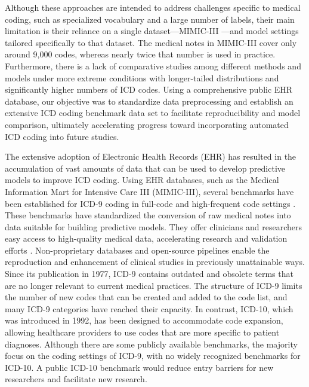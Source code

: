 \documentclass[11pt]{article}
\begin{document}
Although these approaches are intended to address challenges specific to medical coding, such as specialized vocabulary and a large number of labels, their main limitation is their reliance on a single dataset---MIMIC-III \citep{johnson2016mimic}---and model settings tailored specifically to that dataset. The medical notes in MIMIC-III cover only around 9,000 codes, whereas nearly twice that number is used in practice. Furthermore, there is a lack of comparative studies among different methods and models under more extreme conditions with longer-tailed distributions and significantly higher numbers of ICD codes. Using a comprehensive public EHR database, our objective was to standardize data preprocessing and establish an extensive ICD coding benchmark data set to facilitate reproducibility and model comparison, ultimately accelerating progress toward incorporating automated ICD coding into future studies.

The extensive adoption of Electronic Health Records (EHR) has resulted in the accumulation of vast amounts of data that can be used to develop predictive models to improve ICD coding. Using EHR databases, such as the Medical Information Mart for Intensive Care III (MIMIC-III), several benchmarks have been established for ICD-9 coding in full-code and high-frequent code settings \citep{mullenbach-etal-2018-explainable, shi-et-al-2027-automated-icd}. These benchmarks have standardized the conversion of raw medical notes into data suitable for building predictive models. They offer clinicians and researchers easy access to high-quality medical data, accelerating research and validation efforts \citep{ijcai2020-461-vu}. Non-proprietary databases and open-source pipelines enable the reproduction and enhancement of clinical studies in previously unattainable ways. Since its publication in 1977, ICD-9 contains outdated and obsolete terms that are no longer relevant to current medical practices. The structure of ICD-9 limits the number of new codes that can be created and added to the code list, and many ICD-9 categories have reached their capacity. In contrast, ICD-10, which was introduced in 1992, has been designed to accommodate code expansion, allowing healthcare providers to use codes that are more specific to patient diagnoses. Although there are some publicly available benchmarks, the majority focus on the coding settings of ICD-9, with no widely recognized benchmarks for ICD-10. A public ICD-10 benchmark would reduce entry barriers for new researchers and facilitate new research.
\end{document}
